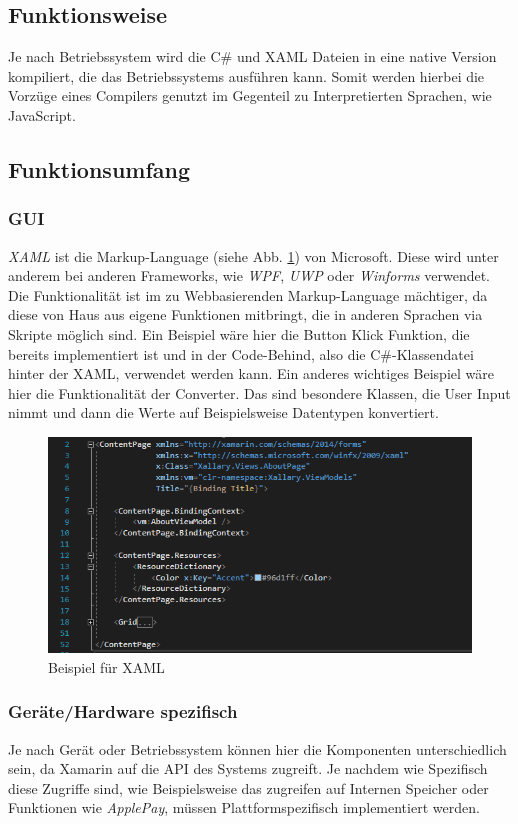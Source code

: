 \documentclass[12pt]{article}
\begin{document}
\subsection{Funktionsweise}
Je nach Betriebssystem wird die C\# und XAML Dateien in eine native Version kompiliert, die das
Betriebssystems ausführen kann. Somit werden hierbei die Vorzüge eines Compilers genutzt im Gegenteil zu Interpretierten Sprachen, wie JavaScript.

\subsection{Funktionsumfang}

\subsubsection{GUI}
\textit{XAML} ist die Markup-Language (siehe Abb. \ref{fig:xamlcode}) von Microsoft. Diese wird unter anderem bei anderen Frameworks, wie \textit{WPF}, \textit{UWP} oder \textit{Winforms} verwendet. Die Funktionalität ist im
zu Webbasierenden Markup-Language mächtiger, da diese von Haus aus eigene
Funktionen mitbringt, die in anderen Sprachen via Skripte möglich sind. Ein Beispiel
wäre hier die Button Klick Funktion, die bereits implementiert ist und in der
Code-Behind, also die C\#-Klassendatei hinter der XAML, verwendet werden kann.
Ein anderes wichtiges Beispiel wäre hier die Funktionalität der Converter. Das sind
besondere Klassen, die User Input nimmt und dann die Werte auf Beispielsweise
Datentypen konvertiert.

\begin{figure}[hbt!]
 \centering
 \includegraphics[width=\textwidth]{xaml-code}
 \caption{Beispiel für XAML}
 \label{fig:xamlcode}
\end{figure}

\subsubsection{Geräte/Hardware spezifisch}
Je nach Gerät oder Betriebssystem können hier die Komponenten unterschiedlich
sein, da Xamarin auf die API des Systems zugreift. Je nachdem wie Spezifisch diese
Zugriffe sind, wie Beispielsweise das zugreifen auf Internen Speicher oder Funktionen
wie \textit{ApplePay}, müssen Plattformspezifisch implementiert werden.
\end{document}
